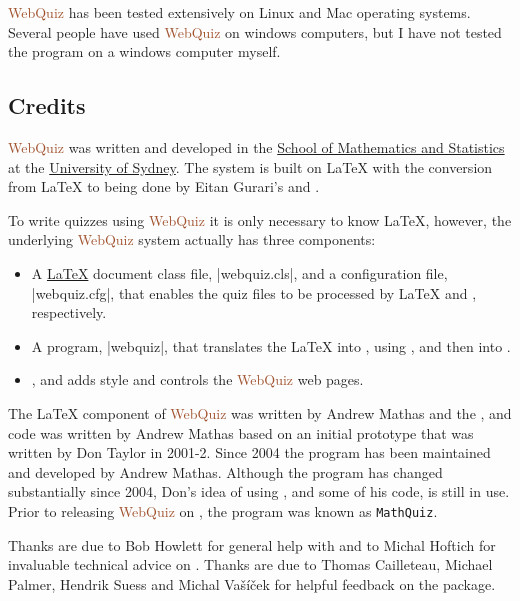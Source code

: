 \documentclass[svgnames]{article}
\newcommand\WebQuiz{\textcolor{Sienna}{WebQuiz}\xspace}
\newcommand\Ctan{\ctan[]{ctan}\xspace}
\begin{document}
    \WebQuiz has been tested extensively on Linux and Mac operating
    systems. Several people have used \WebQuiz on windows computers,
    but I have not tested the program on a windows computer myself.

  \subsection{Credits}
      \WebQuiz{} was written and developed in the
      \href{http://www.maths.usyd.edu.au/}{School of Mathematics and
      Statistics} at the \href{http://www.usyd.edu.au/}{University of
      Sydney}.  The system is built on \LaTeX{} with the conversion from
      \LaTeX{} to \HTML being done by Eitan Gurari's
      \TeXfht and .

      To write quizzes using \WebQuiz it is only necessary to know
      \LaTeX, however, the underlying \WebQuiz system actually has three
      components:
      \begin{itemize}
        \item A \href{https://www.latex-project.org/}{\LaTeX} document class
        file, \BashCode|webquiz.cls|, and a \TeXfht
        configuration file, \BashCode|webquiz.cfg|, that enables the
        quiz files to be processed by \LaTeX{} and \TeXfht, respectively.
        \item A \python program,
        \BashCode|webquiz|, that translates the
        \LaTeX{} into \XML, using \TeXfht, and then into \HTML.
        \item \CSS, \HTML and \Javascript adds style and controls the
        \WebQuiz web pages.
      \end{itemize}

     The \LaTeX{} component of \WebQuiz{} was written by Andrew Mathas and
     the \python, \CSS and \Javascript code was written by Andrew Mathas
     based on an initial prototype that was written by Don Taylor in 2001-2.
     Since 2004 the program has been maintained and developed by Andrew
     Mathas. Although the program has changed substantially since 2004,
     Don's idea of using \TeXfht, and some of his code, is still
     in use. Prior to releasing \WebQuiz on \Ctan, the program was known
     as \texttt{MathQuiz}.

     Thanks are due to Bob Howlett for general help with \CSS and to
     Michal Hoftich for invaluable technical advice on \TeXfht. Thanks
     are due to
        Thomas Cailleteau,
        Michael Palmer,
        Hendrik Suess
        and
        Michal Vašíček
     for helpful feedback on the package.
\end{document}
